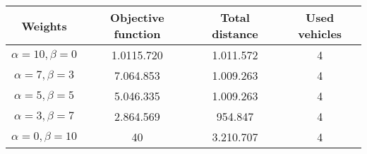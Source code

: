 {
\renewcommand{\arraystretch}{2}
\begin{longtable}[h]{| c | c | c | c |}
    \hline
    \textbf{Weights} & \textbf{Objective function} & \textbf{Total distance} & \textbf{Used vehicles} \\
    \hline
    \endhead
    $\alpha = 10, \beta = 0$ & 1.0115.720 & 1.011.572 & 4 \\
    \hline
    $\alpha = 7, \beta = 3$  &  7.064.853 & 1.009.263 & 4 \\
    \hline
    $\alpha = 5, \beta = 5$  &  5.046.335 & 1.009.263 & 4 \\
    \hline
    $\alpha = 3, \beta = 7$  &  2.864.569 &   954.847 & 4 \\
    \hline
    $\alpha = 0, \beta = 10$ &         40 & 3.210.707 & 4 \\
    \hline
\end{longtable}
}